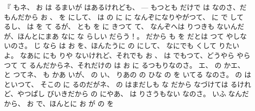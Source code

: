 『
もネ、
お
は
るまいが
はあるけれども、 --- もつとも
だけで
は
なのさ、だもんだから
お
、
を
にして、
は
の
に
に
なんぞになりやがつて、
に
で
して
るし、
は
を
て
るが、
とも
を
に
きつて
て、
なんぞへは
りつきも
ないんだが、ほんとにまあ
なに
な
らしい
だらう！。
だから
も
を
だとは
つて
やしないのさ。
じ
なら
は
お
を、ほんたうに
の
にして、
なにでも
くして
りたいよ。
なあに
にも
りや
ないけれど、それでも
お
、
は
でもつて、どうやら
やら
つて
て
るんだからネ、それだけの
は
お
に
るつもりなのさ。
エ、
の
かエ、
と
つてネ、
も
かあ
いが、
の
い、
りあの
の
ひな
の
を
いてる
なのさ。
の
は
といつて、
そこの
に
るのだがネ、
の
はまだしも
な
だから
なづけては
るけれど、やつぱし
びいきだから
の
にやあ、
は
りさうもない
なのさ。
いふ
なんだから、
お
で、ほんとに
お
が
の
を
